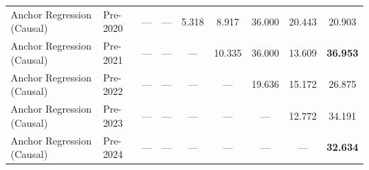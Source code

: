 \begin{table}[htbp]
{\begin{tabular}{l lccccccc}
Anchor Regression (Causal) & Pre-2020 & --- & --- & 5.318 & 8.917 & 36.000 & 20.443 & 20.903 \\
Anchor Regression (Causal) & Pre-2021 & --- & --- & --- & 10.335 & 36.000 & 13.609 & \textbf{36.953} \\
Anchor Regression (Causal) & Pre-2022 & --- & --- & --- & --- & 19.636 & 15.172 & 26.875 \\
Anchor Regression (Causal) & Pre-2023 & --- & --- & --- & --- & --- & 12.772 & 34.191 \\
Anchor Regression (Causal) & Pre-2024 & --- & --- & --- & --- & --- & --- & \textbf{32.634} \\
\bottomrule
\end{tabular}%
}
\end{table}